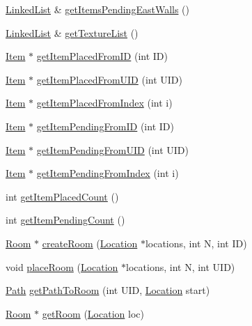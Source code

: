 \begin{DoxyCompactItemize}
\item 
\hyperlink{classLinkedList}{Linked\-List} \& \hyperlink{classShipMaster_a826c21aaa7040180cdda523ee0464c83}{get\-Items\-Pending\-East\-Walls} ()
\item 
\hyperlink{classLinkedList}{Linked\-List} \& \hyperlink{classShipMaster_a4095febdcd811f31f8af7e512cc30962}{get\-Texture\-List} ()
\item 
\hyperlink{classItem}{Item} $\ast$ \hyperlink{classShipMaster_a4e343f85e8732b670e37eb10793b9da5}{get\-Item\-Placed\-From\-I\-D} (int I\-D)
\item 
\hyperlink{classItem}{Item} $\ast$ \hyperlink{classShipMaster_aa6014ba22783d814119df0b8a45f4a3b}{get\-Item\-Placed\-From\-U\-I\-D} (int U\-I\-D)
\item 
\hyperlink{classItem}{Item} $\ast$ \hyperlink{classShipMaster_a7db9c67fae0acefa9a5b61f00d6f1056}{get\-Item\-Placed\-From\-Index} (int i)
\item 
\hyperlink{classItem}{Item} $\ast$ \hyperlink{classShipMaster_a49034c4d14496165dafa091998f9ed92}{get\-Item\-Pending\-From\-I\-D} (int I\-D)
\item 
\hyperlink{classItem}{Item} $\ast$ \hyperlink{classShipMaster_af65799a876a14901fdb2e385a35b32b2}{get\-Item\-Pending\-From\-U\-I\-D} (int U\-I\-D)
\item 
\hyperlink{classItem}{Item} $\ast$ \hyperlink{classShipMaster_ab11c3ab4556669be2863968c5b583d28}{get\-Item\-Pending\-From\-Index} (int i)
\item 
int \hyperlink{classShipMaster_a46e23864a829801068f1e1a9fca0ef82}{get\-Item\-Placed\-Count} ()
\item 
int \hyperlink{classShipMaster_a3581bacb31233e22e0ae5c372b4bdb7c}{get\-Item\-Pending\-Count} ()
\item 
\hyperlink{classRoom}{Room} $\ast$ \hyperlink{classShipMaster_a8e920cb8c50c68d858d2d90d9b8b377a}{create\-Room} (\hyperlink{structLocation}{Location} $\ast$locations, int N, int I\-D)
\item 
void \hyperlink{classShipMaster_aceb6ebe9dc8112ad8bcec3598b83b0e9}{place\-Room} (\hyperlink{structLocation}{Location} $\ast$locations, int N, int U\-I\-D)
\item 
\hyperlink{classPath}{Path} \hyperlink{classShipMaster_acd0cd7045dc4852607f50c13b3780a94}{get\-Path\-To\-Room} (int U\-I\-D, \hyperlink{structLocation}{Location} start)
\item 
\hyperlink{classRoom}{Room} $\ast$ \hyperlink{classShipMaster_a2418804a9b994f7a3c18b8d2edc77aed}{get\-Room} (\hyperlink{structLocation}{Location} loc)

\end{DoxyCompactItemize}
